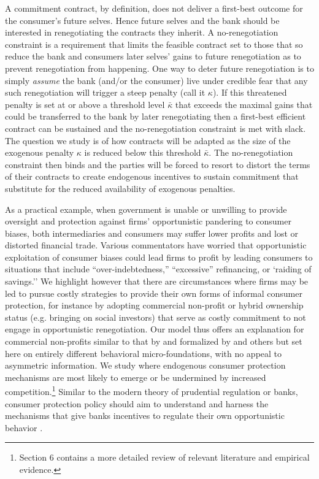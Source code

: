 \documentclass[11pt,english]{article}
\theoremstyle{plain}
\theoremstyle{definition}
\begin{document}
A commitment contract, by definition, does not deliver a first-best
outcome for the consumer's future selves. Hence future selves and the
bank should be interested in renegotiating the contracts they inherit. A no-renegotiation
constraint is a requirement that limits the feasible contract set to those that so reduce the bank and consumers later
selves' gains to future renegotiation as to prevent renegotiation from happening. One way
to deter future renegotiation is to simply \textit{assume}  the bank (and/or
the consumer) live under credible fear that any such renegotiation will trigger
a steep penalty (call it $\kappa$). If this threatened penalty is set
at or above a threshold level $\bar{\kappa}$ that exceeds the maximal
gains that could be transferred to the bank by later renegotiating
then a first-best efficient contract can be sustained and the no-renegotiation
constraint is met with slack. The question we study is of how contracts will be adapted as the size of
the exogenous penalty $\kappa$ is reduced below
this threshold $\bar{\kappa}$. The no-renegotiation
constraint then binds and the parties will be forced to resort to distort
the terms of their contracts to create endogenous incentives to sustain
commitment that substitute for the reduced availability of exogenous penalties.

As a practical example, when government is unable or unwilling to
provide oversight  and protection against  firms' opportunistic pandering to consumer biases,
both intermediaries and consumers may suffer lower profits and lost or distorted
financial trade. Various commentators have  worried that opportunistic exploitation of consumer biases  could lead firms to profit by leading consumers to situations that include    ``over-indebtedness,'' ``excessive'' refinancing, or `raiding of savings.'' We highlight however that there are circumstances where firms may be led to pursue costly strategies to provide their own forms
of informal consumer protection, for instance by adopting commercial non-profit or hybrid ownership status (e.g.
bringing on social investors)
that serve as costly commitment to not engage in opportunistic renegotiation. 
Our model thus offers an explanation
for commercial non-profits similar to that by \citet{hansmann1996a}
and formalized by \citet{glaeser2001} and others but set here on
entirely different behavioral micro-foundations, with no appeal
to asymmetric information. We study where endogenous consumer protection mechanisms are most likely to emerge or be undermined by increased competition.\footnote{Section 6 contains a more detailed review of relevant literature and empirical evidence.} Similar to the modern theory of prudential regulation or banks, consumer protection policy should aim to understand and harness the mechanisms that give  banks incentives to regulate their own opportunistic behavior  \citep{dewatripont1999}.
\end{document}
